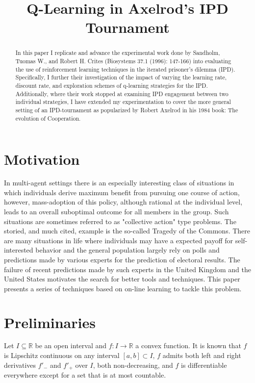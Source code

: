 \documentclass[12pt]{amsart}
\title[Q-Learning in Axelrod's IPD Tournament]
{Q-Learning in Axelrod's IPD Tournament}
\def\Rset{\mathbb{R}}
\newcommand{\0}{\mat{0}}
\newcommand{\1}{\mathds{1}}
\begin{document}
\begin{abstract}
  In this paper I replicate and advance the experimental work done by Sandholm, Tuomas W., and Robert H. Crites (Biosystems 37.1 (1996): 147-166) into evaluating the use of reinforcement learning techniques in the iterated prisoner's dilemma (IPD).  Specifically, I further their investigation of the impact of varying the learning rate, discount rate, and exploration schemes of q-learning strategies for the IPD.  Additionally, where their work stopped at examining IPD engagement between two individual strategies, I have extended my experimentation to cover the more general setting of an IPD-tournament as popularized by Robert Axelrod in his 1984 book: The evolution of Cooperation.

\end{abstract}

\maketitle

\section{Motivation}
In multi-agent settings there is an especially interesting class of situations in which individuals derive maximum benefit from pursuing one course of action, however, mass-adoption of this policy, although rational at the individual level, leads to an overall suboptimal outcome for all members in the group.  Such situations are sometimes referred to as "collective action" type problems.  The storied, and much cited,  example is the so-called Tragedy of the Commons.   There are many situations in life where individuals  may have a  expected payoff for self-interested behavior   and the general population largely rely on polls and
predictions made by various experts for the prediction of electoral
results.  The failure of recent predictions made by such experts in
the United Kingdom and the United States motivates the search for
better tools and techniques. This paper presents a series of
techniques based on on-line learning to tackle this problem.


\section{Preliminaries} 
\label{sec:preliminaries}

Let $I \subseteq \Rset$ be an open interval and $f\colon I \to \Rset$
a convex function. It is known that $f$ is Lipschitz continuous on any
interval $[a, b] \subset I$, $f$ admits both left and right
derivatives $f'_-$ and $f'_+$ over $I$, both non-decreasing, and 
$f$ is differentiable everywhere except for a set that is at most
countable.
\end{document}
